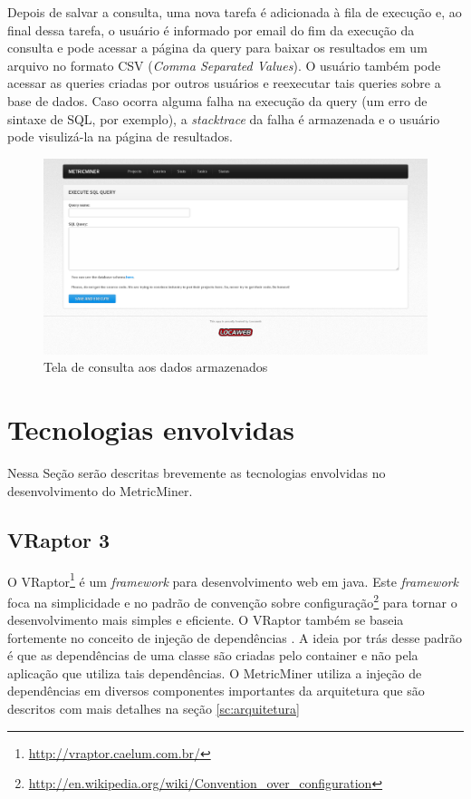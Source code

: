\documentclass[a4paper, 12pt, twoside]{book}
\begin{document}
        Depois de salvar a consulta, uma nova tarefa é adicionada à fila de execução e, ao final dessa tarefa, o usuário é informado por email do fim da execução da consulta e pode acessar a página da query para baixar os resultados em um arquivo no formato CSV (\textit{Comma Separated Values}). O usuário também pode acessar as queries criadas por outros usuários e reexecutar tais queries sobre a base de dados. Caso ocorra alguma falha na execução da query (um erro de sintaxe de SQL, por exemplo), a \textit{stacktrace} da falha é armazenada e o usuário pode visulizá-la na página de resultados.

        \begin{figure}[ht]
            \centering
            \includegraphics[width=1.00\textwidth]{img/query.png}
            \caption{Tela de consulta aos dados armazenados}
            \label{fig:screen_query}
        \end{figure}
        \clearpage

    \section{Tecnologias envolvidas} \label{sc:tecnologias}

        Nessa Seção serão descritas brevemente as tecnologias envolvidas no desenvolvimento do MetricMiner.

        \subsection*{VRaptor 3}
            O VRaptor\footnote{\url{http://vraptor.caelum.com.br/}} é um \textit{framework} para desenvolvimento web em java. Este \textit{framework} foca na simplicidade e no padrão de convenção sobre configuração\footnote{\url{http://en.wikipedia.org/wiki/Convention_over_configuration}} para tornar o desenvolvimento mais simples e eficiente. O VRaptor também se baseia fortemente no conceito de injeção de dependências \cite{fowlerdi}. A ideia por trás desse padrão é que as dependências de uma classe são criadas pelo container e não pela aplicação que utiliza tais dependências. O MetricMiner utiliza a injeção de dependências em diversos componentes importantes da arquitetura que são descritos com mais detalhes na seção \ref{sc:arquitetura}
\end{document}
